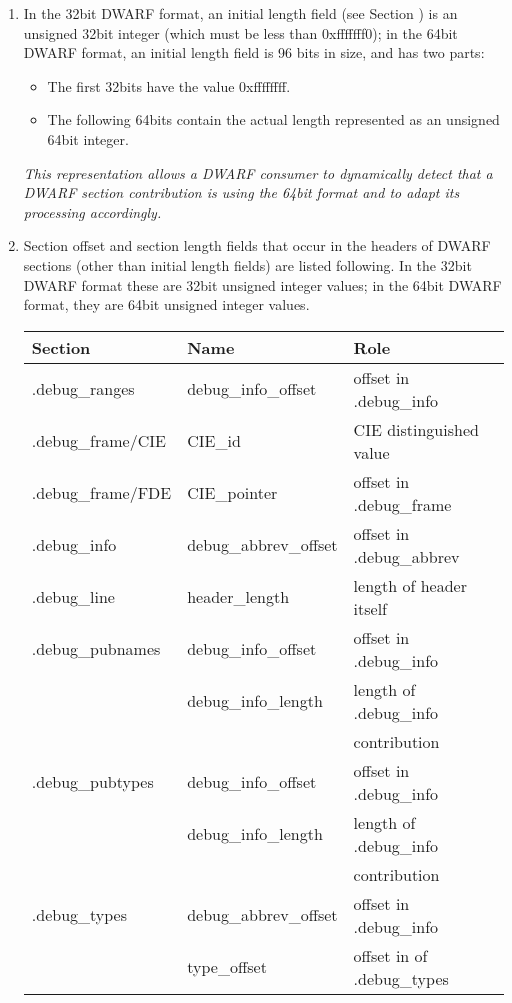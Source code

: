 \begin{enumerate}[1.]

\item  In the 32\dash bit DWARF format, an initial length field
(see Section ) 
is an unsigned 32\dash bit integer (which
must be less than 0xfffffff0); in the 64\dash bit DWARF format,
an initial length field is 96 bits in size, and has two parts:
\begin{itemize}
\item The first 32\dash bits have the value 0xffffffff.

\item  The following 64\dash bits contain the actual length
represented as an unsigned 64\dash bit integer.
\end{itemize}

\textit{This representation allows a DWARF consumer to dynamically
detect that a DWARF section contribution is using the 64\dash bit
format and to adapt its processing accordingly.}

\item Section offset and section length fields that occur
in the headers of DWARF sections (other than initial length
fields) are listed following. In the 32\dash bit DWARF format these
are 32\dash bit unsigned integer values; in the 64\dash bit DWARF format,
they are 64\dash bit unsigned integer values.

\begin{center}
\begin{tabular}{lll}
Section &Name & Role  \\ \hline
.debug\_ranges & debug\_info\_offset & offset in .debug\_info \\
.debug\_frame/CIE & CIE\_id & CIE distinguished value \\
.debug\_frame/FDE & CIE\_pointer & offset in .debug\_frame \\
.debug\_info & debug\_abbrev\_offset & offset in .debug\_abbrev \\
.debug\_line & header\_length & length of header itself \\
.debug\_pubnames & debug\_info\_offset & offset in .debug\_info \\
                & debug\_info\_length & length of .debug\_info \\
                &                   & contribution \\
.debug\_pubtypes & debug\_info\_offset & offset in .debug\_info \\
                & debug\_info\_length & length of .debug\_info \\
                &                   & contribution \\
.debug\_types & debug\_abbrev\_offset & offset in .debug\_info \\
                & type\_offset & offset in of .debug\_types \\


\end{tabular}
\end{center}
\end{enumerate}
